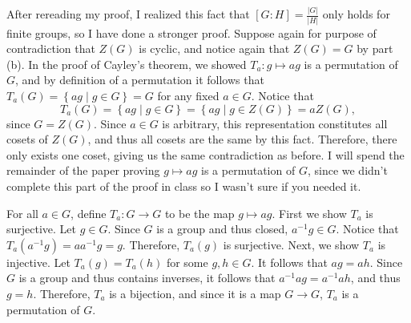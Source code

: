 \documentclass[11pt, letterpaper]{report}
\begin{document}
\begin{solution}
	After rereading my proof, I realized this fact that $\left[ G : H \right] =\frac{\left| G \right| }{\left| H \right| }$ only holds for finite groups, so I have done a stronger proof. Suppose again for purpose of contradiction that $Z(G)$ is cyclic, and notice again that $Z(G)=G$ by part (b). In the proof of Cayley's theorem, we showed $T_a:g\mapsto ag$ is a permutation of $G$, and by definition of a permutation it follows that $T_a(G)=\left\{ ag \mid g\in G \right\} =G$ for any fixed $a\in G$. Notice that
\[
	T_a(G)=\left\{ ag \mid g\in G \right\} =\left\{ ag \mid g\in Z(G) \right\} =aZ(G)
,\]
	since $G=Z(G)$. Since $a\in G$ is arbitrary, this representation constitutes all cosets of  $Z(G)$, and thus all cosets are the same by this fact. Therefore, there only exists one coset, giving us the same contradiction as before. I will spend the remainder of the paper proving $g\mapsto ag$ is a permutation of $G$, since we didn't complete this part of the proof in class so I wasn't sure if you needed it.

	For all $a\in G$, define $T_a : G \to G$ to be the map $g\mapsto ag$. First we show $T_a$ is surjective. Let $g\in G$. Since $G$ is a group and thus closed, $a^{-1}g\in G$. Notice that  $T_a(a^{-1}g)=aa^{-1}g=g$. Therefore, $T_a(g)$ is surjective. Next, we show $T_a$ is injective. Let $T_a(g)=T_a(h)$ for some $g,h\in G$. It follows that $ag=ah$. Since $G$ is a group and thus contains inverses, it follows that $a^{-1}ag=a^{-1}ah$, and thus $g=h$. Therefore, $T_a$ is a bijection, and since it is a map $G\to G$, $T_a$ is a permutation of $G$.
\end{solution}
\end{document}
